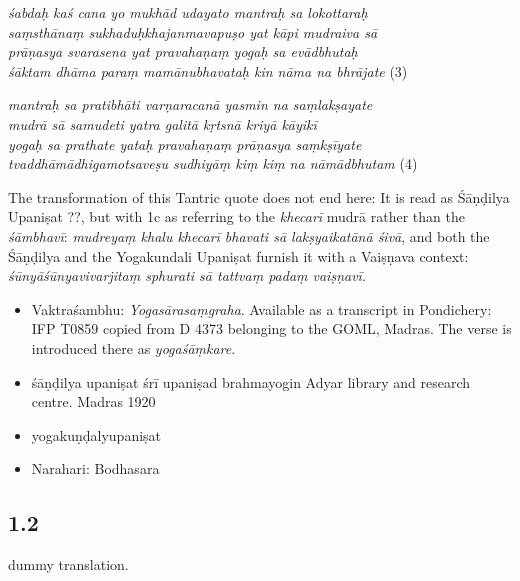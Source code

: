 \begin{ekdosis}
\begin{philcomm}[hp01_001]
    \begin{ekdverse}
      \emph{śabdaḥ kaś cana yo mukhād udayato mantraḥ sa lokottaraḥ}\\
      \emph{saṃsthānaṃ sukhaduḥkhajanmavapuṣo yat kāpi mudraiva sā}\\
      \emph{prāṇasya svarasena yat pravahaṇaṃ yogaḥ sa evādbhutaḥ}\\
      \emph{śāktam dhāma paraṃ mamānubhavataḥ kin nāma na bhrājate} (3)\\
    \end{ekdverse}

    \begin{ekdverse}
      \emph{mantraḥ sa pratibhāti varṇaracanā yasmin na saṃlakṣayate}\\
      \emph{mudrā sā samudeti yatra galitā kṛtsnā kriyā kāyikī}\\
      \emph{yogaḥ sa prathate yataḥ pravahaṇaṃ prāṇasya saṃkṣīyate}\\
      \emph{tvaddhāmādhigamotsaveṣu sudhiyāṃ kiṃ kiṃ na nāmādbhutam} (4)\\
    \end{ekdverse}

    \noindent
    The transformation of this Tantric quote does not end here: It is read as Śāṇḍilya Upaniṣat ??, but
    with 1c as referring to the \emph{khecarī} mudrā rather than the \emph{śāmbhavī}: \emph{mudreyaṃ
      khalu khecarī bhavati sā lakṣyaikatānā śivā}, and both the Śāṇḍilya and the Yogakundali Upaniṣat
    furnish it with a Vaiṣṇava context: \emph{śūnyāśūnyavivarjitaṃ sphurati sā tattvaṃ padaṃ vaiṣṇavī}.

    \begin{itemize}
      \item{Vaktraśambhu: \emph{Yogasārasaṃgraha}. Available as a transcript in Pondichery: IFP T0859 copied from D 4373 belonging to the GOML, Madras. The verse is introduced there as \emph{yogaśāṃkare}.}
      \item{śāṇḍilya upaniṣat śrī upaniṣad brahmayogin Adyar library and research centre. Madras 1920}
      \item{yogakuṇḍalyupaniṣat}
      \item{Narahari: Bodhasara}
    \end{itemize}
  \end{philcomm}


  \subsection*{1.2}
  \begin{translation}[hp01_002]
    dummy translation.
  \end{translation}


\end{ekdosis}
